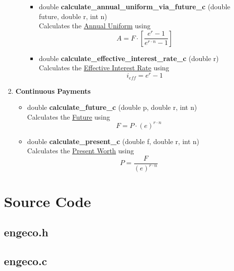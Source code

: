 \documentclass[english,12pt,a4paper,twoside,titlepage,leqno,fleqn]{article}
\begin{document}
\begin{enumerate}
\begin{enumerate}
\begin{itemize}
	\item double {\bfseries calculate\_annual\_uniform\_via\_future\_c} \small{(double future, double r, int n)}\\
	Calculates the \underline{Annual Uniform} using\vspace{1cm} \[A = F\cdot\left[\frac{e^{r}-1}{e^{r\cdot n}-1}\right]\]\vspace{1cm}


	\item double {\bfseries calculate\_effective\_interest\_rate\_c} \small{(double r)}\\
	Calculates the \underline{Effective Interest Rate} using\vspace{1cm} \[i_{eff}=e^{r}-1\]\vspace{1cm}
\end{itemize}
\end{enumerate}
\item {\bfseries Continuous Payments }\vspace{1cm}
\begin{itemize}
	\item double {\bfseries calculate\_future\_c} \small{(double p, double r, int n)}\\
	Calculates the \underline{Future} using\vspace{1cm} \[F = P\cdot(e)^{r\cdot n}\]
	\vspace{1cm}
	\item double {\bfseries calculate\_present\_c} \small{(double f, double r, int n)}\\
	Calculates the \underline{Present Worth} using\vspace{1cm} \[P = \frac{F}{(e)^{r\cdot n}}\]
	\vspace{1cm}
\end{itemize}
\end{enumerate}

\section{Source Code}
\subsection{engeco.h}\label{source}
\subsection{engeco.c}\label{csource}
\end{document}
